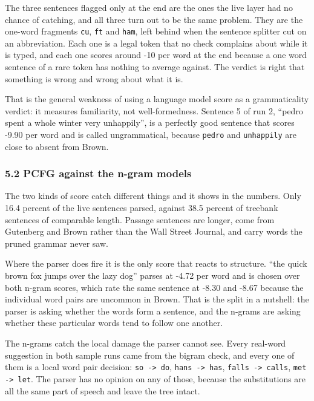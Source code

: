 \documentclass[11pt,a4paper]{article}
\begin{document}
The three sentences flagged only at the end are the ones the live layer had no chance of catching, and all three turn out to be the same problem. They are the one-word fragments \texttt{cu}, \texttt{ft} and \texttt{ham}, left behind when the sentence splitter cut on an abbreviation. Each one is a legal token that no check complains about while it is typed, and each one scores around -10 per word at the end because a one word sentence of a rare token has nothing to average against. The verdict is right that something is wrong and wrong about what it is.

That is the general weakness of using a language model score as a grammaticality verdict: it measures familiarity, not well-formedness. Sentence 5 of run 2, ``pedro spent a whole winter very unhappily'', is a perfectly good sentence that scores -9.90 per word and is called ungrammatical, because \texttt{pedro} and \texttt{unhappily} are close to absent from Brown.

\subsubsection*{5.2 PCFG against the n-gram models}

The two kinds of score catch different things and it shows in the numbers. Only 16.4 percent of the live sentences parsed, against 38.5 percent of treebank sentences of comparable length. Passage sentences are longer, come from Gutenberg and Brown rather than the Wall Street Journal, and carry words the pruned grammar never saw.

Where the parser does fire it is the only score that reacts to structure. ``the quick brown fox jumps over the lazy dog'' parses at -4.72 per word and is chosen over both n-gram scores, which rate the same sentence at -8.30 and -8.67 because the individual word pairs are uncommon in Brown. That is the split in a nutshell: the parser is asking whether the words form a sentence, and the n-grams are asking whether these particular words tend to follow one another.

The n-grams catch the local damage the parser cannot see. Every real-word suggestion in both sample runs came from the bigram check, and every one of them is a local word pair decision: \texttt{so -\allowbreak{}> do}, \texttt{hans -\allowbreak{}> has}, \texttt{falls -\allowbreak{}> calls}, \texttt{met -\allowbreak{}> let}. The parser has no opinion on any of those, because the substitutions are all the same part of speech and leave the tree intact.
\end{document}
